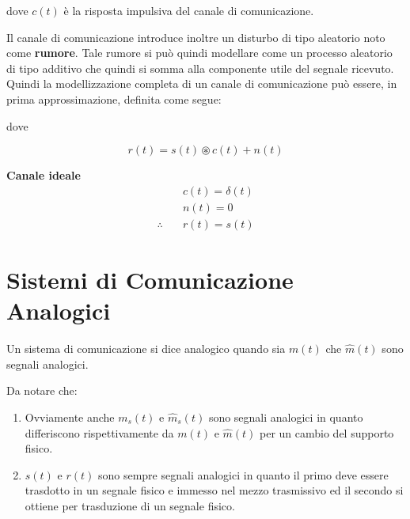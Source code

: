\documentclass{article}
\begin{document}
dove \( c(t) \) è la risposta impulsiva del canale di comunicazione.

\bigskip
Il canale di comunicazione introduce inoltre un disturbo di tipo aleatorio noto come \textbf{rumore}. Tale rumore si può quindi modellare come un processo aleatorio di tipo additivo che quindi si somma alla componente utile del segnale ricevuto.
Quindi la modellizzazione completa di un canale di comunicazione può essere, in prima approssimazione, definita come segue:

\begin{center}
\end{center}

dove

\[
r(t) = s(t) \circledast c(t) + n(t)
\]

\textbf{Canale ideale}
\begin{align*}
    & c(t) = \delta(t) \\
    & n(t) = 0 \\
    \therefore \quad & r(t) = s(t)
\end{align*}


\section*{Sistemi di Comunicazione Analogici}
Un sistema di comunicazione si dice analogico quando sia \( m(t) \) che \( \hat{m}(t) \) sono segnali analogici.

Da notare che:
\begin{enumerate}
    \item Ovviamente anche \( m_s(t) \) e \( \hat{m}_s(t) \) sono segnali analogici in quanto differiscono rispettivamente da \( m(t) \) e \( \hat{m}(t) \) per un cambio del supporto fisico.
    \item \( s(t) \) e \( r(t) \) sono sempre segnali analogici in quanto il primo deve essere trasdotto in un segnale fisico e immesso nel mezzo trasmissivo ed il secondo si ottiene per trasduzione di un segnale fisico.
\end{enumerate}
\end{document}
